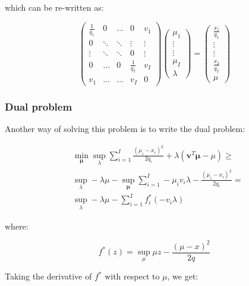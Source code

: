 \documentclass{tex/note}
\begin{document}
which can be re-written as:

\begin{equation*}
\begin{pmatrix} \frac{1}{q_1} & 0 & \hdots & 0 & v_1 \\ 0 & \ddots & \ddots & \vdots & \vdots \\ \vdots & \ddots & \ddots & 0 & \vdots \\ 0 & \hdots & 0 & \frac{1}{q_I} &  v_I \\ v_1 & \hdots & \hdots & v_I & 0 \end{pmatrix} \begin{pmatrix} \mu_1 \\ \vdots \\ \vdots \\ \mu_I \\ \lambda \end{pmatrix} = \begin{pmatrix} \frac{x_1}{q_1} \\ \vdots \\ \vdots \\ \frac{x_I}{q_I} \\ \mu \end{pmatrix}
\end{equation*}

\subsubsection{Dual problem}

Another way of solving this problem is to write the dual problem:

\begin{align*}
& \min_{\bm{\mu}} \sup_{\lambda} \sum_{i = 1}^I \frac{\left( \mu_i - x_i \right)^2}{2 q_i} + \lambda \left( \bm{v}^T \bm{\mu} - \mu \right) \geq \\
& \sup_{\lambda} - \lambda \mu - \sup_{\bm{\mu}} \sum_{i = 1}^I - \mu_i v_i \lambda - \frac{\left( \mu_i - x_i \right)^2}{2 q_i} = \\
& \sup_{\lambda} - \lambda \mu - \sum_{i = 1}^I f_i^* \left( - v_i \lambda \right)
\end{align*}

where:

\begin{equation*}
f^* \left( z \right) = \sup_{\mu} \mu z - \frac{\left( \mu - x \right)^2}{2 q}
\end{equation*}

Taking the derivative of $f^*$ with respect to $\mu$, we get:
\end{document}
